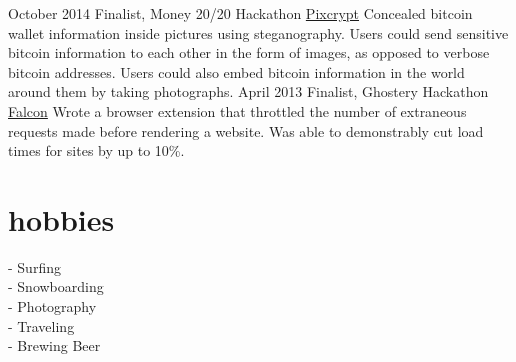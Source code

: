 \documentclass[]{friggeri-cv}
\begin{document}
\begin{entrylist}
  \entry
    {October 2014}
    {Finalist, Money 20/20 Hackathon}
    {\href{http://github.com/dopatraman/pixcrypt}{Pixcrypt}}
    {Concealed bitcoin wallet information inside pictures using steganography. Users could send sensitive bitcoin information to each other in the form of images, as opposed to verbose bitcoin addresses. Users could also embed bitcoin information in the world around them by taking photographs.}
  \entry
    {April 2013}
    {Finalist, Ghostery Hackathon}
    {\href{http://github.com/dopatraman/FalconExtension}{Falcon}}
    {Wrote a browser extension that throttled the number of extraneous requests made before rendering a website. Was able to demonstrably cut load times for sites by up to 10\%.}
\end{entrylist}

\section{hobbies}

  - Surfing\\%
  - Snowboarding\\%
  - Photography\\%
  - Traveling\\%
  - Brewing Beer\\%
\end{document}
